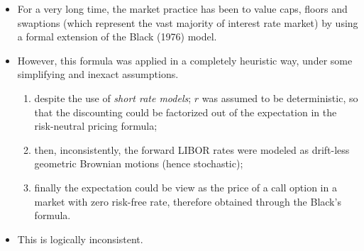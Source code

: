 \documentclass{beamer}
\begin{document}
\begin{frame}
\begin{itemize}
	\item For a very long time, the market practice has been to value caps, floors and swaptions (which represent the vast majority of interest rate market) by using a formal extension of the Black (1976) model. 
	\item However, this formula was applied in a completely heuristic way, under some simplifying and inexact assumptions.
	\begin{enumerate}
		\item despite the use of \emph{short rate models}; $r$ was assumed to be deterministic, so that the discounting could be factorized out of the expectation in the risk-neutral pricing formula; 
 		\item then, inconsistently, the forward LIBOR rates were modeled as drift-less geometric Brownian motions (hence stochastic);
 		\item finally the expectation could be view as the price of a call option in a market with zero risk-free rate, therefore obtained through the Black’s formula.
 	\end{enumerate} 
 	\item This is logically inconsistent.
 	\end{itemize}
\end{frame}
\end{document}
